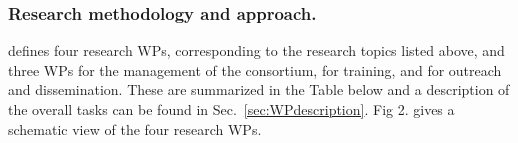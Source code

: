 


\subsubsection{Research methodology and approach.}
\label{sec:metho}


\acronym defines four research WPs, corresponding to the research topics listed above, and three WPs for the management of the consortium, for training, and for outreach and dissemination. These are summarized in the Table below and a description of the overall tasks can be found in Sec.~\ref{sec:WPdescription}. Fig 2. gives a schematic view of the four research WPs. 


